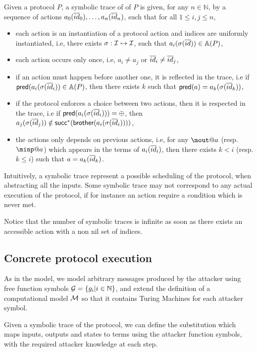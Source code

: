 \begin{definition}
  Given a protocol $P$, a symbolic trace of of $P$ is given, for any $n\in\mathbb{N}$, by a sequence of actions $a_0 (\overline{id}_0),\dots,a_n (\overline{id}_n)$, such that for all $1 \leq i,j \leq n$,
  \begin{itemize}
    \item each action is an instantiation of a protocol action and indices are uniformly instantiated, i.e, there exists $\sigma : \mathcal{I} \mapsto \mathcal{I}$, such that $a_i (\sigma (\overline{id})) \in\mathbb{A}(P)$,
    \item each action occurs only once, i.e, $a_i \neq{} a_j$ or $\overline{id}_i \neq\overline{id}_j$,
    \item if an action must happen before another one, it is reflected in the trace, i.e
      if $\textsf{pred} (a_i(\sigma(\overline{id}_i)) \in \mathbb{A}(P)$, then there exists $k$ such that $\textsf{pred}(a) = a_k(\sigma(\overline{id}_k))$,
    \item if the protocol enforces a choice between two actions, then it is respected in the trace, i.e if $\textsf{pred}(a_i(\sigma(\overline{id}_i))) = \oplus$, then $a_j(\sigma(\overline{id}_j)) \notin \textsf{succ}^*(\textsf{brother} (a_i(\sigma(\overline{id}_i))))$,
      \item the actions only depends on previous actions, i.e, for any $\mout@a$ (resp. $\minp@a$) which appears in the terms of $a_i(\overline{id}_i)$, then there exists $k < i$ (resp. $k \leq i$) such that $a = a_k(\overline{id}_k)$.
      \end{itemize}
\end{definition}
Intuitively, a symbolic trace represent a possible scheduling of the protocol, when abstracting all the inputs. Some symbolic trace may not correspond to any actual execution of the protocol, if for instance an action require a condition which is never met.

Notice that the number of symbolic traces is infinite as soon as there exists an accessible action with a non nil set of indices.


\subsection{Concrete protocol execution}
As in the \BC model, we model arbitrary messages produced by the attacker using free function symbols $\mathcal{G} = \{g_i | i \in \mathbb{N}\} $, and extend the definition of a computational model $\mathcal{M}$ so that it contains Turing Machines for each attacker symbol.

Given a symbolic trace of the protocol, we can define the substitution which maps inputs, outputs and states to terms using the attacker function symbols, with the required attacker knowledge at each step.

